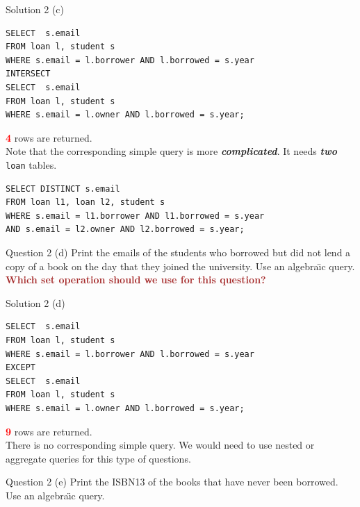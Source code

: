 \begin{frame}[fragile]{Solution 2 (c)}
\begin{lstlisting}
SELECT  s.email 
FROM loan l, student s 
WHERE s.email = l.borrower AND l.borrowed = s.year
INTERSECT
SELECT  s.email 
FROM loan l, student s 
WHERE s.email = l.owner AND l.borrowed = s.year;
\end{lstlisting}
\vspace{5pt}
\textcolor{red}{\textbf{4}} rows are returned.\\
\vspace{10pt}
Note that the corresponding simple query is more \textit{\textbf{complicated}}. It needs \textbf{\textit{two}} \texttt{loan} tables.

\begin{lstlisting}
SELECT DISTINCT s.email 
FROM loan l1, loan l2, student s 
WHERE s.email = l1.borrower AND l1.borrowed = s.year 
AND s.email = l2.owner AND l2.borrowed = s.year;
\end{lstlisting}
\end{frame}

\begin{frame}[fragile]{Question 2 (d)}
Print the emails of the students who borrowed but did not lend a copy of a book on the day that they joined the university. Use an algebra\"{\i}c query.\\
\vspace{10pt}
\textcolor{brown}{\textbf{Which set operation should we use for this question?}}
\end{frame}

\begin{frame}[fragile]{Solution 2 (d)}
\begin{lstlisting}
SELECT  s.email 
FROM loan l, student s 
WHERE s.email = l.borrower AND l.borrowed = s.year
EXCEPT
SELECT  s.email 
FROM loan l, student s 
WHERE s.email = l.owner AND l.borrowed = s.year;
\end{lstlisting}

\vspace{5pt}
\textcolor{red}{\textbf{9}} rows are returned.\\
\vspace{10pt}
There is no corresponding simple query. We would need to use nested or aggregate queries for this type of questions.
\end{frame}

\begin{frame}[fragile]{Question 2 (e)}
Print the ISBN13 of the books that have never been borrowed. Use an algebra\"{\i}c query.
\end{frame}

